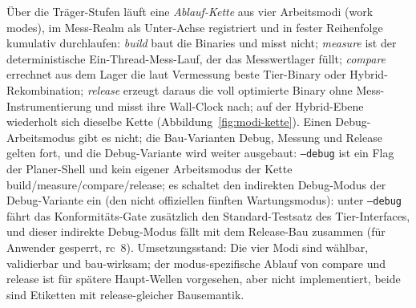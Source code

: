\begin{nurkurz}
Über die Träger-Stufen läuft eine \emph{Ablauf-Kette} aus vier Arbeitsmodi (work modes), im Mess-Realm als
Unter-Achse registriert und in fester Reihenfolge kumulativ durchlaufen: \emph{build} baut die Binaries und
misst nicht; \emph{measure} ist der deterministische Ein-Thread-Mess-Lauf, der das Messwertlager füllt;
\emph{compare} errechnet aus dem Lager die laut Vermessung beste Tier-Binary oder Hybrid-Rekombination;
\emph{release} erzeugt daraus die voll optimierte Binary ohne Mess-Instrumentierung und misst ihre Wall-Clock
nach; auf der Hybrid-Ebene wiederholt sich dieselbe Kette (Abbildung~\ref{fig:modi-kette}). Einen Debug-Arbeitsmodus gibt es nicht; die Bau-Varianten Debug, Messung und Release gelten fort, und die Debug-Variante wird weiter ausgebaut: \texttt{--debug} ist ein Flag der Planer-Shell und kein eigener Arbeitsmodus der Kette build/measure/compare/release; es schaltet den indirekten Debug-Modus der Debug-Variante ein (den nicht offiziellen fünften Wartungsmodus): unter
\texttt{--debug} fährt das Konformitäts-Gate zusätzlich den Standard-Testsatz des Tier-Interfaces, und dieser indirekte
Debug-Modus fällt mit dem Release-Bau zusammen (für Anwender gesperrt, rc~8).
Umsetzungsstand: Die vier Modi sind wählbar, validierbar und bau-wirksam; der modus-spezifische Ablauf von
compare und release ist für spätere Haupt-Wellen vorgesehen, aber nicht implementiert, beide sind Etiketten
mit release-gleicher Bausemantik.
\begin{figure}[htbp]\centering
{}
\end{figure}
\end{nurkurz}
